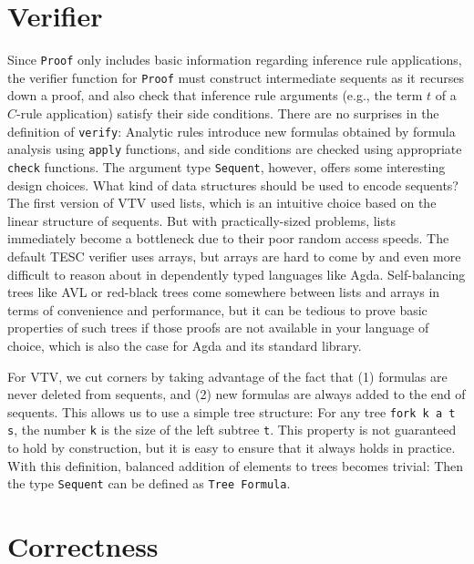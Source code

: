 \documentclass[12pt]{article}
\begin{document}
\section{Verifier} \label{sec:verifier} 

Since \verb|Proof| only includes basic information regarding inference rule 
applications, the verifier function for \verb|Proof| must construct 
intermediate sequents as it recurses down 
a proof, and also check that inference rule arguments (e.g., the term $t$ 
of a $C$-rule application) satisfy their side conditions. There are no 
surprises in the definition of \verb|verify|: 
Analytic rules introduce new formulas obtained by formula analysis using 
\verb|apply| functions, and side conditions are checked using appropriate 
\verb|check| functions. The argument type \verb|Sequent|, however, offers 
some interesting design choices. What kind of data structures should be 
used to encode sequents? The first version of VTV used lists, which
is an intuitive choice based on the linear structure of sequents. But with 
practically-sized problems, lists immediately become a bottleneck due to 
their poor random access speeds. The default TESC verifier uses arrays, 
but arrays are hard to come by and even more difficult to reason about in 
dependently typed languages like Agda. Self-balancing trees like AVL or 
red-black trees come somewhere between lists and arrays in terms of 
convenience and performance, but it can be tedious to prove basic properties 
of such trees if those proofs are not available in your language of 
choice, which is also the case for Agda and its standard library.

For VTV, we cut corners by taking advantage of the fact that (1) formulas 
are never deleted from sequents, and (2) new formulas are always added to the 
end of sequents. This allows us to use a simple tree structure:
For any tree \verb|fork k a t s|, the number \verb|k| is the size of the  
left subtree \verb|t|. This property is not guaranteed to hold by construction,
but it is easy to ensure that it always holds in practice. With this definition,
balanced addition of elements to trees becomes trivial:
Then the type \verb|Sequent| can be defined as \verb|Tree Formula|.



\section{Correctness} \label{sec:correctness}
\end{document}
